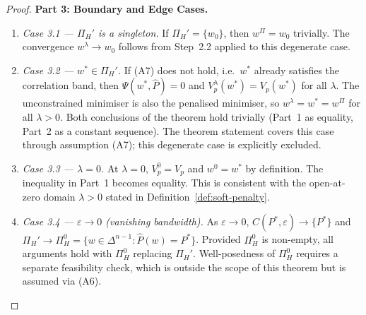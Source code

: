 \documentclass[12pt,openany]{book}
\newcommand{\bfw}{\mathbf{w}}
\newcommand{\calC}{\mathcal{C}}
\numberwithin{equation}{chapter}
\theoremstyle{plain}
\theoremstyle{definition}
\theoremstyle{remark}
\def\mathcal#1{#1}%
\def\calC{C}%
\def\bfw{w}%
\begin{document}
\begin{proof}
\medskip
\noindent\textbf{Part 3: Boundary and Edge Cases.}
\begin{enumerate}
  \item \emph{Case 3.1 — $\Pi_H'$ is a singleton.}
        If $\Pi_H' = \{\bfw_0\}$, then $\bfw^{\Pi} = \bfw_0$ trivially.
        The convergence $\bfw^\lambda \to \bfw_0$ follows from
        Step~2.2 applied to this degenerate case.

  \item \emph{Case 3.2 — $\bfw^* \in \Pi_H'$.}
        If (A7) does not hold, i.e.\ $\bfw^*$ already satisfies the
        correlation band, then $\Psi(\bfw^*,\hat{P}) = 0$ and
        $V_p^\lambda(\bfw^*) = V_p(\bfw^*)$ for all $\lambda$.
        The unconstrained minimiser is also the penalised minimiser,
        so $\bfw^\lambda = \bfw^* = \bfw^{\Pi}$ for all $\lambda > 0$.
        Both conclusions of the theorem hold trivially (Part~1 as
        equality, Part~2 as a constant sequence).  The theorem statement
        covers this case through assumption (A7); this degenerate case
        is explicitly excluded.

  \item \emph{Case 3.3 — $\lambda = 0$.}
        At $\lambda = 0$, $V_p^0 = V_p$ and
        $\bfw^0 = \bfw^*$ by definition.  The inequality in Part~1
        becomes equality.  This is consistent with the open-at-zero
        domain $\lambda > 0$ stated in Definition~\ref{def:soft-penalty}.

  \item \emph{Case 3.4 — $\varepsilon \to 0$ (vanishing bandwidth).}
        As $\varepsilon \to 0$, $\calC(P^*,\varepsilon) \to \{P^*\}$
        and $\Pi_H' \to \Pi_H^0 = \{\bfw \in \Delta^{n-1} :
        \hat{P}(\bfw) = P^*\}$.  Provided $\Pi_H^0$ is non-empty,
        all arguments hold with $\Pi_H^0$ replacing $\Pi_H'$.
        Well-posedness of $\Pi_H^0$ requires a separate feasibility
        check, which is outside the scope of this theorem but is
        assumed via (A6).


\end{enumerate}
\end{proof}
\end{document}

